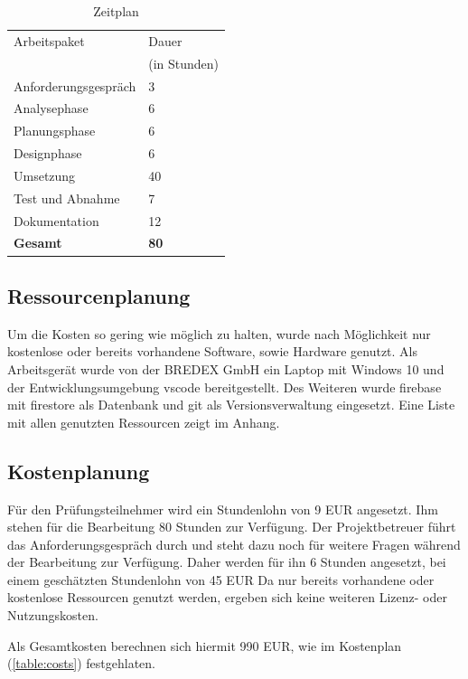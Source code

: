 \documentclass[11pt]{article}
\begin{document}
\begin{table}[H]
    \centering
    \begin{tabular}{|l | l|}
        \hline
        Arbeitspaket & Dauer \\
        & (in Stunden) \\
        \hline
        Anforderungsgespräch & 3 \\
        Analysephase & 6 \\
        Planungsphase & 6 \\
        Designphase & 6 \\
        Umsetzung & 40 \\
        Test und Abnahme & 7 \\
        Dokumentation & 12 \\
        \hline
        \textbf{Gesamt} & \textbf{80} \\
        \hline
    \end{tabular}
    \caption{Zeitplan}
    \label{table:timeplan}
\end{table}

\subsection{Ressourcenplanung}
Um die Kosten so gering wie möglich zu halten, wurde nach Möglichkeit nur
kostenlose oder bereits vorhandene Software, sowie Hardware genutzt.
Als Arbeitsgerät wurde von der BREDEX GmbH ein Laptop mit Windows 10 und der
Entwicklungsumgebung \gls{vscode} bereitgestellt.
Des Weiteren wurde \gls{firebase} mit \gls{firestore} als Datenbank und \Gls{git} als 
Versionsverwaltung eingesetzt.\newline
Eine Liste mit allen genutzten Ressourcen zeigt  im Anhang. 

\subsection{Kostenplanung}
Für den Prüfungsteilnehmer wird ein Stundenlohn von 9 EUR angesetzt. %
Ihm stehen für die Bearbeitung 80 Stunden zur Verfügung.
Der Projektbetreuer führt das Anforderungsgespräch durch und steht 
dazu noch für weitere Fragen während der Bearbeitung zur Verfügung.
Daher werden für ihn 6 Stunden angesetzt, bei einem geschätzten 
Stundenlohn von 45 EUR
Da nur bereits vorhandene oder kostenlose Ressourcen genutzt werden,
ergeben sich keine weiteren Lizenz- oder Nutzungskosten.

Als Gesamtkosten berechnen sich hiermit 990 EUR, wie im Kostenplan (\autoref{table:costs}) festgehlaten.
\end{document}
